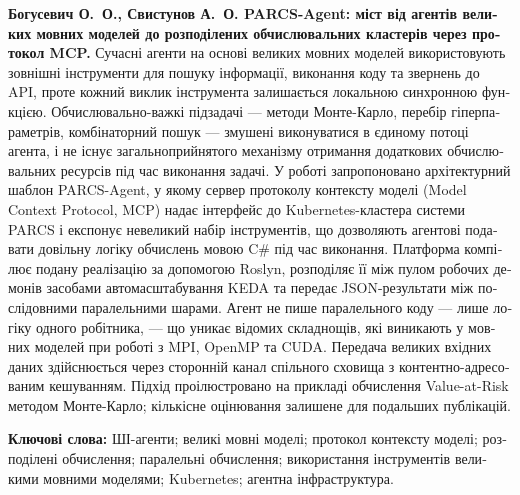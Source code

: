 
\begin{otherlanguage}{ukrainian}
\begin{citabstract}
\noindent\textbf{Богусевич О.~О., Свистунов А.~О. PARCS-Agent: міст від агентів великих мовних моделей до розподілених обчислювальних кластерів через протокол MCP.}
Сучасні агенти на основі великих мовних моделей використовують зовнішні інструменти для пошуку інформації, виконання коду та звернень до API, проте кожний виклик інструмента залишається локальною синхронною функцією. Обчислювально-важкі підзадачі --- методи Монте-Карло, перебір гіперпараметрів, комбінаторний пошук --- змушені виконуватися в єдиному потоці агента, і не існує загальноприйнятого механізму отримання додаткових обчислювальних ресурсів під час виконання задачі. У роботі запропоновано архітектурний шаблон PARCS-Agent, у якому сервер протоколу контексту моделі (Model Context Protocol, MCP) надає інтерфейс до Kubernetes-кластера системи PARCS і експонує невеликий набір інструментів, що дозволяють агентові подавати довільну логіку обчислень мовою C\# під час виконання. Платформа компілює подану реалізацію за допомогою Roslyn, розподіляє її між пулом робочих демонів засобами автомасштабування KEDA та передає JSON-результати між послідовними паралельними шарами. Агент не пише паралельного коду --- лише логіку одного робітника, --- що уникає відомих складнощів, які виникають у мовних моделей при роботі з MPI, OpenMP та CUDA. Передача великих вхідних даних здійснюється через сторонній канал спільного сховища з контентно-адресованим кешуванням. Підхід проілюстровано на прикладі обчислення Value-at-Risk методом Монте-Карло; кількісне оцінювання залишене для подальших публікацій.

\medskip
\noindent\textbf{Ключові слова:} ШІ-агенти; великі мовні моделі; протокол контексту моделі;
розподілені обчислення; паралельні обчислення; використання інструментів великими мовними моделями;
Kubernetes; агентна інфраструктура.
\end{citabstract}
\end{otherlanguage}
